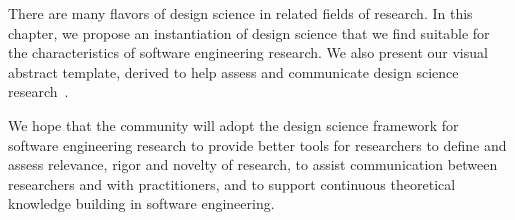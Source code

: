 \documentclass[graybox]{svmult}
\begin{document}
There are many flavors of design science in related fields of research. In this chapter, we propose an instantiation of design science that we find suitable for the characteristics of software engineering research. We also present our visual abstract template, derived to help assess and communicate design science research~\cite{StoreyESEM17}. 

We hope that the community will adopt the design science framework for software engineering research to provide better tools for researchers to define and assess relevance, rigor and novelty of research, to assist communication between researchers and with practitioners, and to support continuous theoretical knowledge building in software engineering. 




\end{document}
